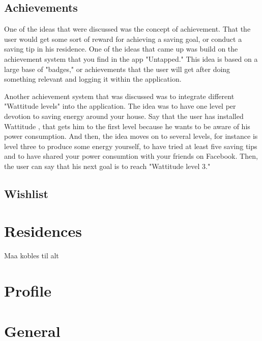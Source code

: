 \subsection{Achievements}
One of the ideas that were discussed was the concept of achievement. That the user would get some sort of reward for achieving a saving goal, or conduct a saving tip in his residence. One of the ideas that came up was build on the achievement system that you find in the app "Untapped." 
This idea is based on a large base of "badges," or achievements that the user will get after doing something relevant and logging it within the application. 

Another achievement system that was discussed was to integrate different "Wattitude levels" into the application. The idea was to have one level per devotion to saving energy around your house. Say that the user has installed Wattitude , that gets him to the first level because he wants to be aware of his power consumption. And then, the idea moves on to several levels, for instance is level three to produce some energy yourself, to have tried at least five saving tips and to have shared your power consumtion with your friends on Facebook.  Then, the user can say that his next goal is to reach "Wattitude level 3." 

\subsection{Wishlist}

\section{Residences}
Maa kobles til alt

\section{Profile}


\section{General}